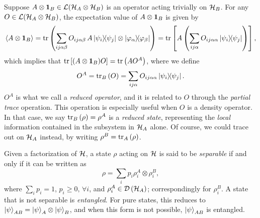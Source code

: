 		Suppose $A \otimes \mathbf{1}_B \in \mathcal{L}(\mathcal{H}_A \otimes \mathcal{H}_B)$ is an operator acting trivially on $\mathcal{H}_B$. For any $O \in \mathcal{L}(\mathcal{H}_A \otimes \mathcal{H}_B)$, the expectation value of $A \otimes \mathbf{1}_B$ is given by
		\begin{align*}
			\ev{A \otimes \id_B}
			= \tr{ \sum_{ij\alpha\beta} O_{ij\alpha\beta} \, A\ketbra{\psi_i}{\psi_j} \otimes \ketbra{\varphi_\alpha}{\varphi_\beta} } 
			= \trb{ A \left( \sum_{ij\alpha} O_{ij\alpha\alpha} \ketbra{\psi_i}{\psi_j} \right) } ,
		\end{align*}
		which implies that $\text{tr}\left[ (A \otimes \mathbf{1}_B) O \right] = \text{tr}\left( A O^A \right)$, where we define
		$$
			O^A = \text{tr}_{B}\left( O \right) = \sum_{ij\alpha} O_{ij\alpha\alpha} \ketbra{\psi_i}{\psi_j} .
		$$
		$O^A$ is what we call a \emph{reduced operator}, and it is related to $O$ through the \emph{partial trace} operation. This operation is especially useful when $O$ is a density operator. In that case, we say $\text{tr}_{B}\left( \rho \right) = \rho^A$ is a \emph{reduced state}, representing the \emph{local} information contained in the subsystem in $\mathcal{H}_A$ alone. Of course, we could trace out on $\mathcal{H}_A$ instead, by writing $\rho^B = \text{tr}_{A}\left( \rho \right)$.
	
	
		Given a factorization of $\mathcal{H}$, a state $\rho$ acting on $\mathcal{H}$ is said to be \emph{separable} if and only if it can be written as 
		\begin{equation}
			\rho = \sum_i p_i \rho_i^A \otimes \rho_i^B , 
			\label{eq:separable-state}
		\end{equation}
		where $\sum_i p_i = 1$, $p_i \geq 0, \,\forall i$, and $\rho_i^A \in \mathcal{D}\left( \mathcal{H}_A \right)$; correspondingly for $\rho_i ^B$. A state that is not separable is \emph{entangled}. For pure states, this reduces to $\ket{\psi}_{AB} = \ket{\psi}_A \otimes \ket{\psi}_B$, and when this form is not possible, $\ket{\psi}_{AB}$ is entangled. 
	
